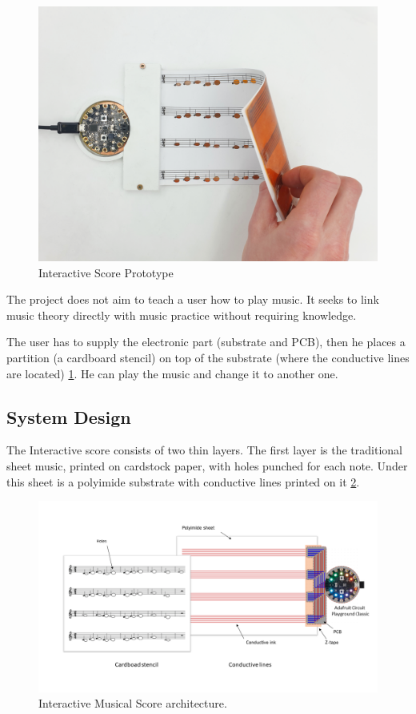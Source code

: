 \begin{figure}[h]
   \centering
   \includegraphics{images/IS_demo.png}
   \caption{Interactive Score Prototype}
   \label{fig:IS_demo}
\end{figure}

The project does not aim to teach a user how to play music. It seeks to link music theory directly with music practice without requiring knowledge.

The user has to supply the electronic part (substrate and PCB), then he places a partition (a cardboard stencil) on top of the substrate (where
the conductive lines are located) \ref{fig:IS_demo}. He can play the music and change it to another one.

\subsection{System Design}

The Interactive score consists of two thin layers. The first layer is the traditional sheet
music, printed on cardstock paper, with holes punched for each note. Under this sheet
is a polyimide substrate with conductive lines printed on it \ref{fig:IS_schema}.

\begin{figure}[h]
   \centering
   \includegraphics{images/IS_schema.png}
   \caption{Interactive Musical Score architecture.}
   \label{fig:IS_schema}
\end{figure}

